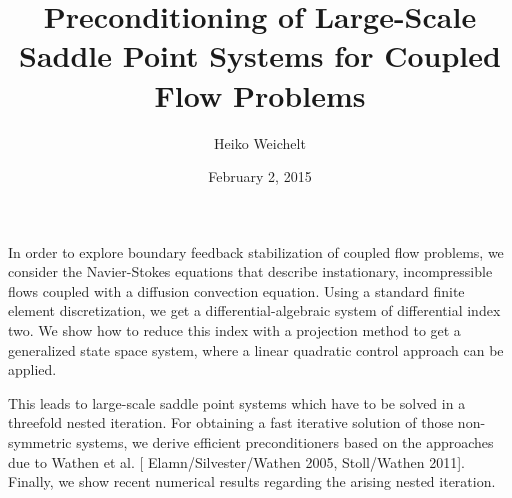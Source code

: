 \documentclass{article}
\title{Preconditioning of Large-Scale Saddle Point Systems
  for Coupled Flow Problems}
\author{Heiko Weichelt}
\affil{PhD student at Max Planck Institute for Dynamics of Complex
    Technical Systems Magdeburg, Germany}
\date{February 2, 2015}
\begin{document}
\maketitle
\setcounter{page}{7}
In order to explore boundary feedback stabilization of coupled flow
problems, we consider the Navier-Stokes equations that describe
instationary, incompressible flows coupled with a diffusion convection
equation. Using a standard finite element discretization, we get a
differential-algebraic system of differential index two. We show how
to reduce this index with a projection method to get a generalized
state space system, where a linear quadratic control approach can be
applied.

This leads to large-scale saddle point systems which have to be solved
in a threefold nested iteration. For obtaining a fast iterative
solution of those non-symmetric systems, we derive efficient
preconditioners based on the approaches due to Wathen et al. [{\sc
  Elamn/Silvester/Wathen 2005, Stoll/Wathen 2011}]. Finally, we show
recent numerical results regarding the arising nested iteration.
\end{document}
